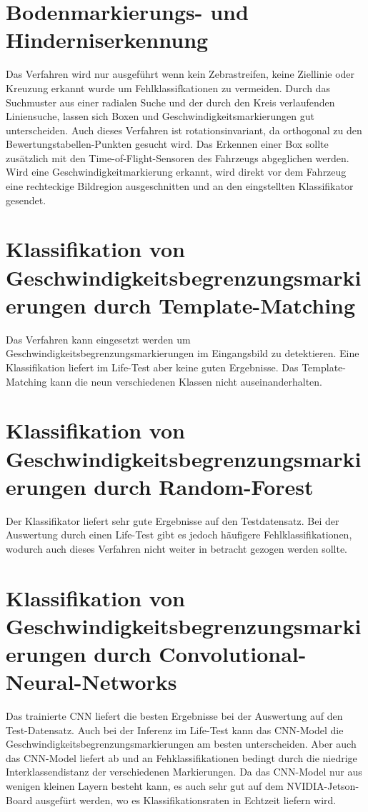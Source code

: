 \section{Bodenmarkierungs- und Hinderniserkennung}
\label{section:Bodenmarkierungs- und Hinderniserkennung}
Das Verfahren wird nur ausgef\"uhrt wenn kein Zebrastreifen, keine Ziellinie oder Kreuzung erkannt wurde um Fehlklassifkationen zu vermeiden.
Durch das Suchmuster aus einer radialen Suche und der durch den Kreis verlaufenden Liniensuche, lassen sich Boxen und Geschwindigkeitsmarkierungen gut unterscheiden. Auch dieses Verfahren ist rotationsinvariant, da orthogonal zu den Bewertungstabellen-Punkten gesucht wird. Das Erkennen einer Box sollte zus\"atzlich mit den Time-of-Flight-Sensoren des Fahrzeugs abgeglichen werden. Wird eine Geschwindigkeitmarkierung erkannt, wird direkt vor dem Fahrzeug eine rechteckige Bildregion ausgeschnitten und an den eingstellten Klassifikator gesendet. 


\section{Klassifikation von Geschwindigkeitsbegrenzungsmarkierungen durch Template-Matching}
\label{Klassifikation von Geschwindigkeitsbegrenzungsmarkierungen durch Template-Matching}
Das Verfahren kann eingesetzt werden um Geschwindigkeitsbegrenzungsmarkierungen im Eingangsbild zu detektieren.
Eine Klassifikation liefert im Life-Test aber keine guten Ergebnisse.
Das Template-Matching kann die neun verschiedenen Klassen nicht auseinanderhalten.


\section{Klassifikation von Geschwindigkeitsbegrenzungsmarkierungen durch Random-Forest}
\label{Klassifikation von Geschwindigkeitsbegrenzungsmarkierungen durch Random-Forest}
Der Klassifikator liefert sehr gute Ergebnisse auf den Testdatensatz.
Bei der Auswertung durch einen Life-Test gibt es jedoch h\"aufigere Fehlklassifikationen, wodurch auch dieses Verfahren nicht weiter in betracht gezogen werden sollte.

\section{Klassifikation von Geschwindigkeitsbegrenzungsmarkierungen durch Convolutional-Neural-Networks}
\label{Klassifikation von Geschwindigkeitsbegrenzungsmarkierungen durch Convolutional-Neural-Networks}
Das trainierte CNN liefert die besten Ergebnisse bei der Auswertung auf den Test-Datensatz. Auch bei der Inferenz im Life-Test kann das CNN-Model die Geschwindigkeitsbegrenzungsmarkierungen am besten unterscheiden. Aber auch das CNN-Model liefert ab und an Fehklassifikationen bedingt durch die niedrige Interklassendistanz der verschiedenen Markierungen. Da das CNN-Model nur aus wenigen kleinen Layern besteht kann, es auch sehr gut auf dem NVIDIA-Jetson-Board ausgef\"urt werden, wo es Klassifikationsraten in Echtzeit liefern wird. 






 
